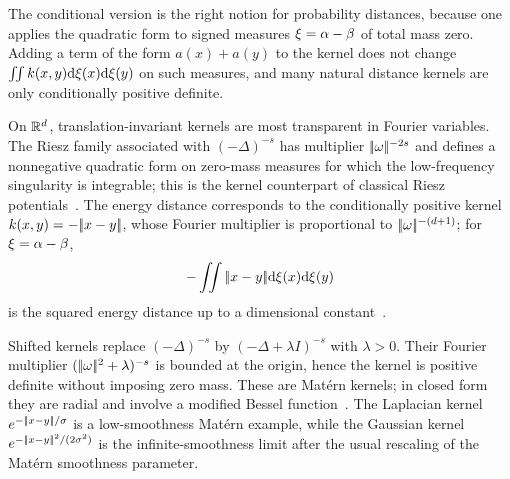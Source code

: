 The conditional version is the right notion for probability distances, because one applies the quadratic form to signed measures $\xi=\alpha-\beta$ of total mass zero. Adding a term of the form $a(x)+a(y)$ to the kernel does not change $\iint k(x,y)\mathrm{d}\xi(x)\mathrm{d}\xi(y)$ on such measures, and many natural distance kernels are only conditionally positive definite.

\begin{example}
	On $\mathbb{R}^d$, translation-invariant kernels are most transparent in Fourier variables. The Riesz family associated with $(-\Delta)^{-s}$ has multiplier $|\!| \omega |\!|^{-2s}$ and defines a nonnegative quadratic form on zero-mass measures for which the low-frequency singularity is integrable; this is the kernel counterpart of classical Riesz potentials~\cite{berg84harmonic}. The energy distance corresponds to the conditionally positive kernel $k(x,y)=-|\!| x-y |\!|$, whose Fourier multiplier is proportional to $|\!| \omega |\!|^{-(d+1)}$; for $\xi=\alpha-\beta$,
	\[
		-\iint |\!| x-y |\!|\mathrm{d}\xi(x)\mathrm{d}\xi(y)
	\]
	is the squared energy distance up to a dimensional constant~\cite{schoenberg38,szekely2004testing}.

	Shifted kernels replace $(-\Delta)^{-s}$ by $(-\Delta+\lambda I)^{-s}$ with $\lambda>0$. Their Fourier multiplier $(|\!| \omega |\!|^2+\lambda)^{-s}$ is bounded at the origin, hence the kernel is positive definite without imposing zero mass. These are Mat\'ern kernels; in closed form they are radial and involve a modified Bessel function~\cite{wendland2005scattered}. The Laplacian kernel $e^{-|\!| x-y |\!|/\sigma}$ is a low-smoothness Mat\'ern example, while the Gaussian kernel $e^{-|\!| x-y |\!|^2/(2\sigma^2)}$ is the infinite-smoothness limit after the usual rescaling of the Mat\'ern smoothness parameter.
\end{example}


